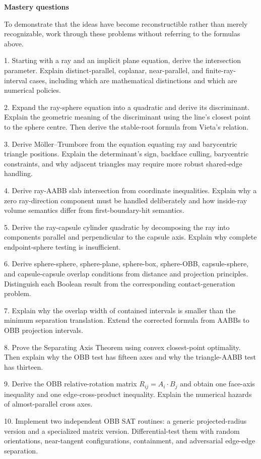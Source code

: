 \textbf{Mastery questions}

To demonstrate that the ideas have become reconstructible rather than merely recognizable, work through these problems without referring to the formulas above.

1. Starting with a ray and an implicit plane equation, derive the intersection parameter. Explain distinct-parallel, coplanar, near-parallel, and finite-ray-interval cases, including which are mathematical distinctions and which are numerical policies.

2. Expand the ray-sphere equation into a quadratic and derive its discriminant. Explain the geometric meaning of the discriminant using the line's closest point to the sphere centre. Then derive the stable-root formula from Vieta's relation.

3. Derive Möller--Trumbore from the equation equating ray and barycentric triangle positions. Explain the determinant's sign, backface culling, barycentric constraints, and why adjacent triangles may require more robust shared-edge handling.

4. Derive ray-AABB slab intersection from coordinate inequalities. Explain why a zero ray-direction component must be handled deliberately and how inside-ray volume semantics differ from first-boundary-hit semantics.

5. Derive the ray-capsule cylinder quadratic by decomposing the ray into components parallel and perpendicular to the capsule axis. Explain why complete endpoint-sphere testing is insufficient.

6. Derive sphere-sphere, sphere-plane, sphere-box, sphere-OBB, capsule-sphere, and capsule-capsule overlap conditions from distance and projection principles. Distinguish each Boolean result from the corresponding contact-generation problem.

7. Explain why the overlap width of contained intervals is smaller than the minimum separation translation. Extend the corrected formula from AABBs to OBB projection intervals.

8. Prove the Separating Axis Theorem using convex closest-point optimality. Then explain why the OBB test has fifteen axes and why the triangle-AABB test has thirteen.

9. Derive the OBB relative-rotation matrix \(R_{ij}=A_i\cdot B_j\) and obtain one face-axis inequality and one edge-cross-product inequality. Explain the numerical hazards of almost-parallel cross axes.

10. Implement two independent OBB SAT routines: a generic projected-radius version and a specialized matrix version. Differential-test them with random orientations, near-tangent configurations, containment, and adversarial edge-edge separation.

